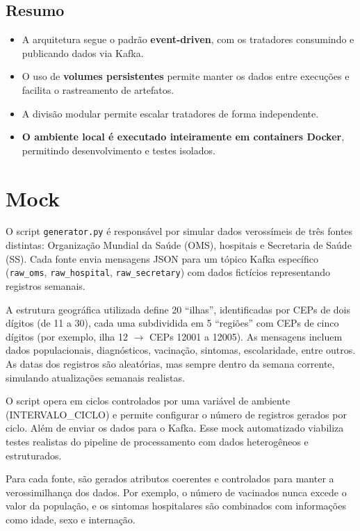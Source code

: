 \documentclass[a4paper,12pt]{article}
\begin{document}
\subsection{Resumo}

\begin{itemize}
  \item A arquitetura segue o padrão \textbf{event-driven}, com os tratadores consumindo e publicando dados via Kafka.
  \item O uso de \textbf{volumes persistentes} permite manter os dados entre execuções e facilita o rastreamento de artefatos.
  \item A divisão modular permite escalar tratadores de forma independente.
  \item \textbf{O ambiente local é executado inteiramente em containers Docker}, permitindo desenvolvimento e testes isolados.
\end{itemize}

\section{Mock}

O script \texttt{generator.py} é responsável por simular dados verossímeis de três fontes distintas: Organização Mundial da Saúde (OMS), hospitais e Secretaria de Saúde (SS). Cada fonte envia mensagens JSON para um tópico Kafka específico (\texttt{raw\_oms}, \texttt{raw\_hospital}, \texttt{raw\_secretary}) com dados fictícios representando registros semanais.

A estrutura geográfica utilizada define 20 ``ilhas'', identificadas por CEPs de dois dígitos (de 11 a 30), cada uma subdividida em 5 ``regiões'' com CEPs de cinco dígitos (por exemplo, ilha 12 $\rightarrow$ CEPs 12001 a 12005). As mensagens incluem dados populacionais, diagnósticos, vacinação, sintomas, escolaridade, entre outros. As datas dos registros são aleatórias, mas sempre dentro da semana corrente, simulando atualizações semanais realistas.

O script opera em ciclos controlados por uma variável de ambiente (INTERVALO\_CICLO) e permite configurar o número de registros gerados por ciclo. Além de enviar os dados para o Kafka. Esse mock automatizado viabiliza testes realistas do pipeline de processamento com dados heterogêneos e estruturados.

Para cada fonte, são gerados atributos coerentes e controlados para manter a verossimilhança dos dados. Por exemplo, o número de vacinados nunca excede o valor da população, e os sintomas hospitalares são combinados com informações como idade, sexo e internação. 
\end{document}
